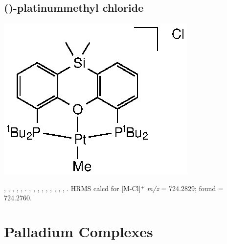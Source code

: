 
\subsection*{(\tBuSixantphosk)-platinummethyl chloride}
\begin{structure}[h]
\begin{center}
\includegraphics{../Structures/SitBuPtMe.eps}
\end{center}
\end{structure}

,
,
,
,
,
.
,
,
,
,
,
,
,
,
,
.
HRMS calcd for  [M-Cl]$^+$ \emph{m/z} = 724.2829; found = 724.2760.


\section{Palladium Complexes}
\label{section:experimental:palladium}


